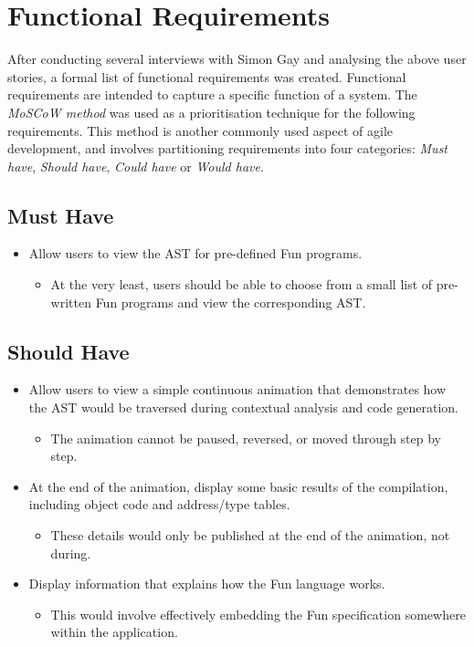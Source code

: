 \documentclass{l4proj}
\begin{document}
\section{Functional Requirements}
After conducting several interviews with Simon Gay and analysing the above user stories, a formal list of functional requirements was created. Functional requirements are intended to capture a specific function of a system. The \textit {MoSCoW method} was used as a prioritisation technique for the following requirements. This method is another commonly used aspect of agile development, and involves partitioning requirements into four categories: \textit{Must have}, \textit{Should have}, \textit{Could have} or \textit{Would have}.
\subsection{Must Have}
\begin{itemize}
\item Allow users to view the AST for pre-defined Fun programs.
\begin{itemize}
\item At the very least, users should be able to choose from a small list of pre-written Fun programs and view the corresponding AST.
\end{itemize}
\end{itemize}
\subsection{Should Have}
\begin{itemize}
\item Allow users to view a simple continuous animation that demonstrates how the AST would be traversed during contextual analysis and code generation.
\begin{itemize}
\item The animation cannot be paused, reversed, or moved through step by step.
\end{itemize}
\item At the end of the animation, display some basic results of the compilation, including object code and address/type tables.
\begin{itemize}
\item These details would only be published at the end of the animation, not during.
\end{itemize}
\item Display information that explains how the Fun language works.
\begin{itemize}
\item This would involve effectively embedding the Fun specification somewhere within the application.
\end{itemize}
\end{itemize}
\end{document}
